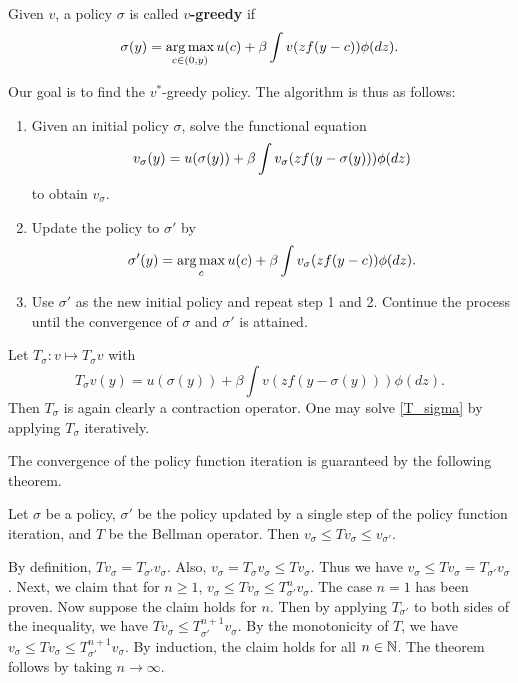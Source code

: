 \documentclass[12pt]{article}
\begin{document}
\begin{definition}
    Given $v$, a policy $\sigma$ is called \textbf{$v$-greedy} if  
    \begin{equation}
        \sigma(y) = \operatorname*{arg\,max}_{c\in (0,y)} u(c) + \beta\int v(zf(y-c))\phi(dz).
    \end{equation}
\end{definition}
Our goal is to find the $v^*$-greedy policy. The algorithm is thus 
as follows:
\begin{enumerate}
    \item Given an initial policy $\sigma$, solve the functional equation 
    \begin{equation}\eqlab{T_sigma}
        v_\sigma(y) = u(\sigma(y)) + \beta\int v_\sigma(zf(y-\sigma(y)))\phi(dz)
    \end{equation} 
    to obtain $v_\sigma$.
    \item Update the policy to $\sigma'$ by 
    \begin{equation}
        \sigma'(y) = \operatorname*{arg\,max}_{c} u(c) + \beta\int v_\sigma(zf(y-c))\phi(dz).
    \end{equation}
    \item Use $\sigma'$ as the new initial policy and repeat step 
    1 and 2. Continue the process until the convergence of $\sigma$ 
    and $\sigma'$ is attained.
\end{enumerate}
\begin{remark}
    Let $T_\sigma: v\mapsto T_\sigma v$ with 
    \begin{equation}
        T_\sigma v(y) = u(\sigma(y)) + \beta\int v(zf(y-\sigma(y)))\phi(dz).
    \end{equation} 
    Then $T_\sigma$ is again clearly a contraction operator. One may 
    solve \eqref{T_sigma} by applying $T_\sigma$ iteratively. 
\end{remark}

The convergence of the policy function iteration is guaranteed 
by the following theorem. 
\begin{theorem}
    Let $\sigma$ be a policy, $\sigma'$ be the policy updated by 
    a single step of the policy function iteration, and $T$ be the 
    Bellman operator. Then $v_\sigma\leq Tv_\sigma \leq v_{\sigma'}$.
\end{theorem}
\begin{pf}
    By definition, $Tv_\sigma = T_{\sigma'} v_\sigma$. Also, 
    $v_\sigma = T_\sigma v_\sigma \leq Tv_\sigma$. Thus we have 
    $v_\sigma \leq Tv_\sigma = T_{\sigma'} v_\sigma$. Next, we 
    claim that for $n\geq 1$, $v_\sigma \leq Tv_\sigma\leq T^n_{\sigma'} v_\sigma$. 
    The case $n = 1$ has been proven. Now suppose the claim holds for 
    $n$. Then by applying $T_{\sigma'}$ to both sides of the 
    inequality, we have $Tv_\sigma \leq T^{n+1}_{\sigma'} v_\sigma$. 
    By the monotonicity of $T$, we have $v_\sigma \leq Tv_\sigma \leq 
    T^{n+1}_{\sigma'} v_\sigma$. By induction, the claim holds for 
    all $n\in\mathbb{N}$. The theorem follows by taking $n\to\infty$.
\end{pf}
\end{document}
